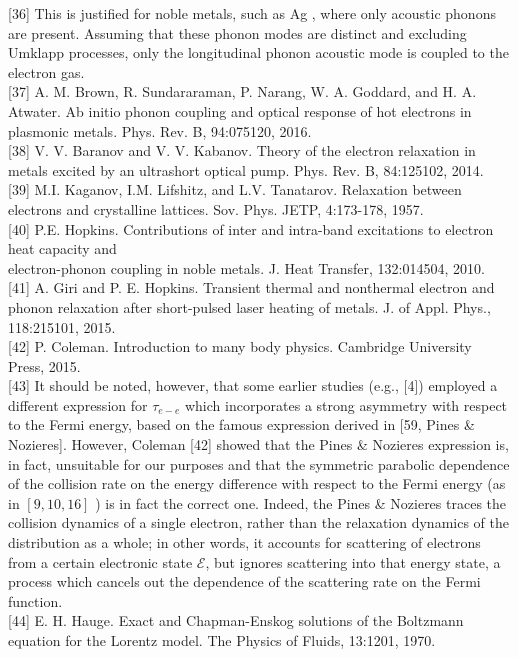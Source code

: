 \documentclass[10pt]{article}
\begin{document}
[36] This is justified for noble metals, such as Ag , where only acoustic phonons are present. Assuming that these phonon modes are distinct and excluding Umklapp processes, only the longitudinal phonon acoustic mode is coupled to the electron gas.\\[0pt]
[37] A. M. Brown, R. Sundararaman, P. Narang, W. A. Goddard, and H. A. Atwater. Ab initio phonon coupling and optical response of hot electrons in plasmonic metals. Phys. Rev. B, 94:075120, 2016.\\[0pt]
[38] V. V. Baranov and V. V. Kabanov. Theory of the electron relaxation in metals excited by an ultrashort optical pump. Phys. Rev. B, 84:125102, 2014.\\[0pt]
[39] M.I. Kaganov, I.M. Lifshitz, and L.V. Tanatarov. Relaxation between electrons and crystalline lattices. Sov. Phys. JETP, 4:173-178, 1957.\\[0pt]
[40] P.E. Hopkins. Contributions of inter and intra-band excitations to electron heat capacity and\\
electron-phonon coupling in noble metals. J. Heat Transfer, 132:014504, 2010.\\[0pt]
[41] A. Giri and P. E. Hopkins. Transient thermal and nonthermal electron and phonon relaxation after short-pulsed laser heating of metals. J. of Appl. Phys., 118:215101, 2015.\\[0pt]
[42] P. Coleman. Introduction to many body physics. Cambridge University Press, 2015.\\[0pt]
[43] It should be noted, however, that some earlier studies (e.g., [4]) employed a different expression for $\tau_{e-e}$ which incorporates a strong asymmetry with respect to the Fermi energy, based on the famous expression derived in [59, Pines \& Nozieres]. However, Coleman [42] showed that the Pines \& Nozieres expression is, in fact, unsuitable for our purposes and that the symmetric parabolic dependence of the collision rate on the energy difference with respect to the Fermi energy (as in $[9,10,16]$ ) is in fact the correct one. Indeed, the Pines \& Nozieres traces the collision dynamics of a single electron, rather than the relaxation dynamics of the distribution as a whole; in other words, it accounts for scattering of electrons from a certain electronic state $\mathcal{E}$, but ignores scattering into that energy state, a process which cancels out the dependence of the scattering rate on the Fermi function.\\[0pt]
[44] E. H. Hauge. Exact and Chapman-Enskog solutions of the Boltzmann equation for the Lorentz model. The Physics of Fluids, 13:1201, 1970.\\[0pt]
\end{document}

